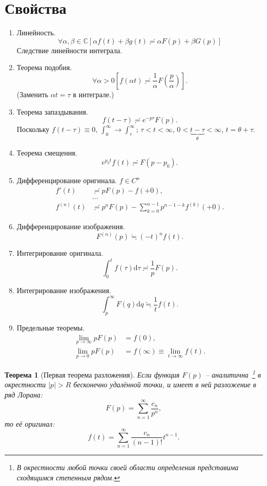 \documentclass[12pt]{report}
\renewcommand{\C}{\mathbb C}
\newcommand{\rd}{\mathrm d}
\newtheorem{thm}{Теорема}
\begin{document}
\section{Свойства~\cite{Dubkov:Lecture}}
\begin{enumerate}
	\item Линейность.
	\[
	\forall\alpha,\beta\in\C\left[\alpha f(t)+\beta g(t) \risingdotseq \alpha F(p) + \beta G(p)\right]
	\]
	Следствие линейности интеграла.
	\item Теорема подобия.
	\[
	\forall\alpha>0 \left[f(\alpha t) \risingdotseq \frac 1\alpha F\left(\frac p\alpha\right) \right].
	\]
	(Заменить $\alpha t = \tau$ в интеграле.)
	\item Теорема запаздывания.\label{itm:prop-offset}
	\[
	f(t-\tau) \risingdotseq e^{-p\tau} F(p).
	\]
	Поскольку $f(t-\tau) \equiv 0$, $\int_0^\infty \to \int_\tau^\infty$; $\tau < t < \infty$, 
	$0 < \underbrace{t-\tau}_{\theta} < \infty$, $t = \theta + \tau$.
	\item Теорема смещения.
	\[
	e^{p_0t} f(t) \risingdotseq F(p-p_0).
	\]
	\item Дифференцирование оригинала. $f\in C^n$ \label{itm:prop-diff-original}
	\begin{align*}
	f'(t) &\risingdotseq p F(p) - f(+0), \\
	&\dots \\
	f^{(n)}(t) &\risingdotseq p^nF(p) -\sum_{k=0}^{n-1}p^{n-1-k}f^{(k)}(+0).
	\end{align*}
	\item Дифференцирование изображения.
	\[
	F^{(n)}(p) \fallingdotseq (-t)^nf(t).
	\]
	\item  Интегрирование оригинала.
	\[
	\int_0^t f(\tau)\rd\tau \risingdotseq \frac 1p F(p).
	\]
	\item Интегрирование изображения.
	\[
	\int_p^\infty F(q)\rd q \fallingdotseq \frac 1t f(t).
	\]
	\item Предельные теоремы.
	\begin{align*}
		\lim\limits_{p\to \infty} pF(p) &= f(0),\\
		\lim\limits_{p\to0} pF(p) &= f(\infty) \equiv \lim_{t\to\infty}f(t).
	\end{align*}
\end{enumerate}

\begin{thm}[Первая теорема разложения]
	Если функция $F(p)$ -- аналитична~\footnote{В окрестности любой точки своей области определения представима сходящимся степенным рядом.} в окрестности $|p|>R$ бесконечно удалённой точки, и имеет в ней разложение в ряд Лорана:
	\[
	F(p) = \sum_{n=1}^{\infty}\frac{c_n}{p^n},
	\]
	то её оригинал:
	\[
	f(t) = \sum_{n=1}^{\infty}\frac{c_n}{(n-1)!}t^{n-1}.
	\]
\end{thm}
\end{document}
